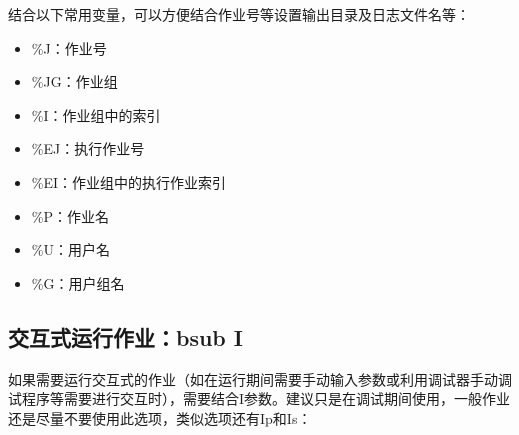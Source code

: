 \documentclass[a4paper,12pt,english]{sphinxmanual}
\begin{document}
\sphinxAtStartPar
结合以下常用变量，可以方便结合作业号等设置输出目录及日志文件名等：
\begin{itemize}
\item {} 
\sphinxAtStartPar
\%J：作业号

\item {} 
\sphinxAtStartPar
\%JG：作业组

\item {} 
\sphinxAtStartPar
\%I：作业组中的索引

\item {} 
\sphinxAtStartPar
\%EJ：执行作业号

\item {} 
\sphinxAtStartPar
\%EI：作业组中的执行作业索引

\item {} 
\sphinxAtStartPar
\%P：作业名

\item {} 
\sphinxAtStartPar
\%U：用户名

\item {} 
\sphinxAtStartPar
\%G：用户组名

\end{itemize}


\subsection{交互式运行作业：bsub \sphinxhyphen{}I}
\label{\detokenize{lsf/lsf:bsub-i}}
\sphinxAtStartPar
如果需要运行交互式的作业（如在运行期间需要手动输入参数或利用调试器手动调试程序等需要进行交互时），需要结合\sphinxhyphen{}I参数。建议只是在调试期间使用，一般作业还是尽量不要使用此选项，类似选项还有\sphinxhyphen{}Ip和\sphinxhyphen{}Is：

\sphinxAtStartPar
{}
\end{document}
